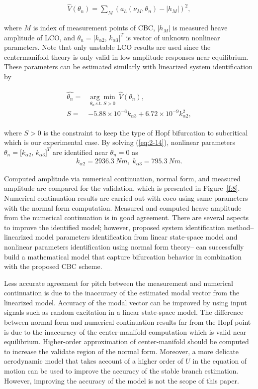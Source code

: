\documentclass[openacc]{rsproca_new}%
\newcommand{\Eref}[1]{(\ref{#1})}
\newcommand{\Fref}[1]{Figure~\ref{#1}}
\begin{document}
\begin{align}\label{eq:2-13}
\hat{V}(\theta_n)=\sum_M (a_h(\nu_M,\theta_n)-|h_M|)^2,
\end{align}

\noindent where $M$ is index of measurement points of CBC, $|h_M|$ is measured heave amplitude of LCO, and $\theta_n=[k_{\alpha2}$, $k_{\alpha3}]^T$ is vector of unknown nonlinear parameters. Note that only unstable LCO results are used since the centermanifold theory is only valid in low amplitude responses near equilibrium. These parameters can be estimated similarly with linearized system identification by

\begin{align}\label{eq:2-14}
\begin{split}
\hat{\theta_n}=&\underset{\theta_n \: \textrm{s.t.} \: S>0} {\arg\min} \: \hat V(\theta_n),\\
S=&- 5.88 \times 10^{-6}  k_{\alpha 3} + 6.72 \times 10^{-9} k_{\alpha 2}^2,
\end{split}
\end{align}

\noindent where $S>0$ is the constraint to keep the type of Hopf bifurcation to subcritical which is our experimental case. By solving \Eref{eq:2-14}, nonlinear parameters $\theta_n=[k_{\alpha2}$, $k_{\alpha3}]^T$ are identified near $\theta_n=0$ as
\begin{align}\label{eq:2-15}
k_{\alpha2}=2936.3 \: Nm, \; k_{\alpha3}=795.3 \: Nm.
\end{align}

Computed amplitude via numerical continuation, normal form, and measured amplitude are compared for the validation, which is presented in \Fref{f:8}. Numerical continuation results are carried out with coco \cite{dankowicz2013recipes} using same parameters with the normal form computation. Measured and computed heave amplitude from the numerical continuation is in good agreement. There are several aspects to improve the identified model; however, proposed system identification method-- linearized model parameters identification from linear state-space model and nonlinear parameters identification using normal form theory-- can successfully build a mathematical model that capture bifurcation behavior in combination with the proposed CBC scheme.

Less accurate agreement for pitch between the measurement and numerical continuation is due to the inaccuracy of the estimated modal vector from the linearized model. Accuracy of the modal vector can be improved by using input signals such as random excitation in a linear state-space model. The difference between normal form and numerical continuation results far from the Hopf point is due to the inaccuracy of the center-manifold computation which is valid near equilibrium. Higher-order approximation of center-manifold should be computed to increase the validate region of the normal form. Moreover, a more delicate aerodynamic model that takes account of a higher order of $U$ in the equation of motion can be used to improve the accuracy of the stable branch estimation. However, improving the accuracy of the model is not the scope of this paper.
\end{document}
